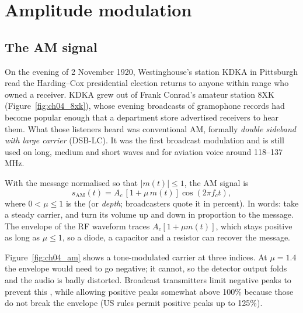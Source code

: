 \section{Amplitude modulation}
\label{sec:ch04:am}

\subsection{The AM signal}

On the evening of 2 November 1920, Westinghouse's station KDKA in Pittsburgh read the
Harding--Cox presidential election returns to anyone within range who owned a receiver. KDKA grew out of
Frank Conrad's amateur station 8XK (Figure~\ref{fig:ch04_8xk}), whose evening broadcasts of
gramophone records had become popular enough that a department store advertised receivers to hear
them. What those listeners heard was conventional AM, formally \emph{double sideband with large
carrier} (DSB-LC). It was the first broadcast modulation and is still used on long, medium and short
waves and for aviation voice around 118--137\,MHz.


With the message normalised so that $|m(t)|\le 1$, the AM signal is
\begin{equation}
s_{\text{AM}}(t)=A_c\,[1+\mu\,m(t)]\cos(2\pi f_c t),
\label{eq:ch04:am}
\end{equation}
where $0<\mu\le 1$ is the  (or \emph{depth}; broadcasters quote it in percent).
In words: take a steady carrier, and turn its volume up and down in proportion to the message. The
envelope of the RF waveform traces $A_c[1+\mu m(t)]$, which stays positive as long as $\mu\le1$, so a
diode, a capacitor and a resistor can recover the message.

Figure~\ref{fig:ch04_am} shows a tone-modulated carrier at three indices. At $\mu=1.4$ the envelope
would need to go negative; it cannot, so the detector output folds and the audio is badly distorted.
Broadcast transmitters limit negative peaks to prevent this , while allowing
positive peaks somewhat above 100\% because those do not break the envelope (US rules permit positive
peaks up to 125\%).

